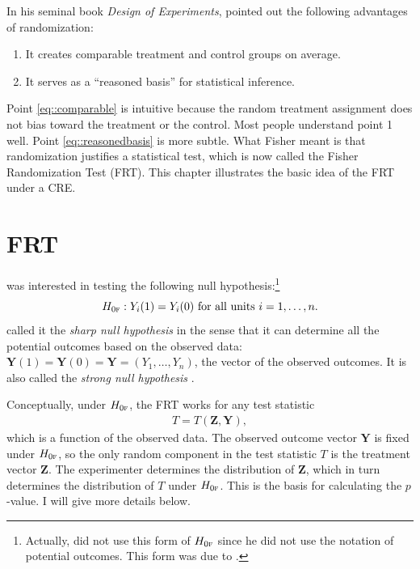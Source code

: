 In his seminal book {\it Design of Experiments}, \citet{Fisher:1935} pointed out the following advantages of randomization:
\begin{enumerate}
[(1)]
\item\label{eq::comparable}
It creates comparable treatment and control groups on average.

\item\label{eq::reasonedbasis}
It serves as a ``reasoned basis'' for statistical inference. 
 \end{enumerate}
 
 
Point \ref{eq::comparable} is intuitive because the random treatment assignment does not bias toward the treatment or the control. Most people understand point 1 well. Point \ref{eq::reasonedbasis} is more subtle. What Fisher meant is that randomization justifies a statistical test, which is now called the Fisher Randomization Test (FRT). This chapter illustrates the basic idea of the FRT  under a CRE.


\section{FRT}
\label{sec::frt-basics}

\citet{Fisher:1935} was interested in testing the following null hypothesis:\footnote{Actually, \citet{Fisher:1935} did not use this form of $H_{0\textsc{f}}$ since he did not use the notation of potential outcomes. This form was due to \citet{Rubin:1980}.}
$$
H_{0\textsc{f}}: Y_i(1) = Y_i(0) \text{ for all units } i=1,\ldots, n.
$$
\citet{Rubin:1980} called it the {\it sharp null hypothesis} in the sense that it can determine all the potential outcomes based on the observed data: $\bm{Y}(1) = \bm{Y}(0) =  \bm{Y} = (Y_1, \ldots, Y_n)$, the vector of the observed outcomes. It is also called the {\it strong null hypothesis} \citep[e.g.,][]{wu2018randomization}. 


Conceptually, under $H_{0\textsc{f}}$, the FRT works for any test statistic 
\begin{eqnarray}\label{eq::teststatistic}
T = T( \bm{Z}, \bm{Y})  ,
\end{eqnarray}
which is a function of the observed data. The observed outcome vector $\bm{Y}$ is fixed under $H_{0\textsc{f}}$, so the only random component in the test statistic $T$ is the treatment vector $\bm{Z}$. The experimenter determines the distribution of $\bm{Z}$, which in turn determines the distribution of $T$ under $H_{0\textsc{f}}$. This is the basis for calculating the $p$-value. I will give more details below. 


